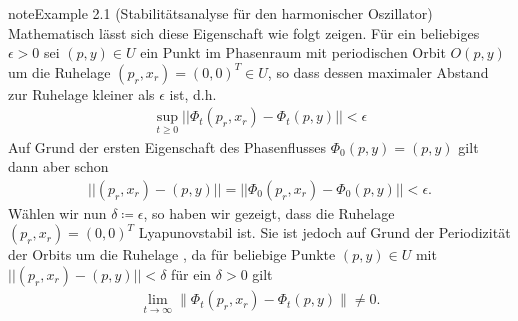 \documentclass[letterpaper,10pt,german]{jupyterBook}
\begin{document}
\begin{sphinxadmonition}{note}{Example 2.1 (Stabilitätsanalyse für den harmonischer Oszillator)}
\sphinxAtStartPar
Mathematisch lässt sich diese Eigenschaft wie folgt zeigen.
Für ein beliebiges \(\epsilon > 0\) sei \((p,y) \in U\) ein Punkt im Phasenraum mit periodischen Orbit \(O(p,y)\) um die Ruhelage \((p_r,x_r) = (0,0)^T \in U\), so dass dessen maximaler Abstand zur Ruhelage kleiner als \(\epsilon\) ist, d.h.
\begin{equation*}
\begin{split}\sup_{t \geq 0} ||\Phi_t(p_r,x_r) - \Phi_t(p,y)|| < \epsilon\end{split}
\end{equation*}
\sphinxAtStartPar
Auf Grund der ersten Eigenschaft des Phasenflusses \(\Phi_0(p,y) = (p,y)\) gilt dann aber schon
\begin{equation*}
\begin{split}||(p_r, x_r) - (p,y)|| = ||\Phi_0(p_r, x_r) - \Phi_0(p,y)|| < \epsilon.\end{split}
\end{equation*}
\sphinxAtStartPar
Wählen wir nun \(\delta \coloneqq \epsilon\), so haben wir gezeigt, dass die Ruhelage \((p_r, x_r) = (0,0)^T\) Lyapunov\sphinxhyphen{}stabil ist.
Sie ist jedoch auf Grund der Periodizität der Orbits um die Ruhelage , da für beliebige Punkte \((p,y) \in U\) mit \(||(p_r,x_r) - (p,y)|| < \delta\) für ein \(\delta > 0\) gilt
\begin{equation*}
\begin{split}\lim_{t\to\infty}\|\Phi_t(p_r, x_r)-\Phi_t(p,y)\| \neq 0.\end{split}
\end{equation*}\end{sphinxadmonition}
\end{document}
